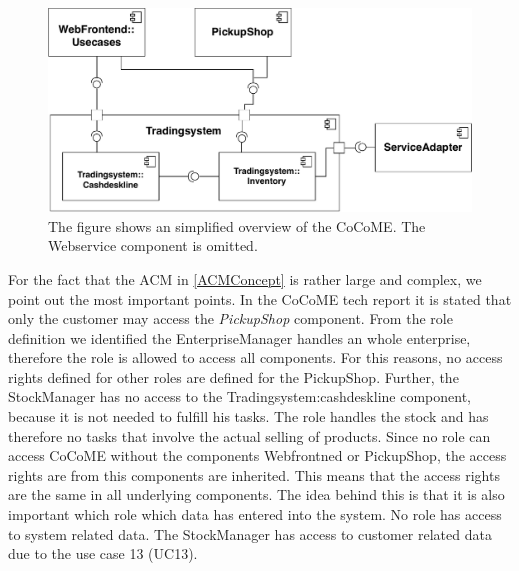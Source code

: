 \begin{figure}
\includegraphics[scale=.8]{logos/Overview_CoCoME.pdf}
\caption{The figure shows an simplified overview of the CoCoME. The Webservice component is omitted.}
\label{CoCoME_simplified}
\end{figure}
For the fact that the ACM in \autoref{ACMConcept} is rather large and complex, we point out the most important points. In the CoCoME tech report it is stated that only the customer may access the \textit{PickupShop}  component. From the role definition we identified the EnterpriseManager handles an whole enterprise, therefore the role is allowed to access all components. For this reasons, no access rights defined for other roles are defined for the PickupShop. Further, the StockManager has no access to the Tradingsystem:cashdeskline component, because it is not needed to fulfill his tasks. The role handles the stock and has therefore no tasks that involve the actual selling of products. Since no role can access CoCoME without the components Webfrontned or PickupShop, the access rights are from this components are inherited. This means that the access rights are the same in all underlying components. The idea behind this is that it is also important which role which data has entered into the system. No role has access to system related data. The StockManager has access to customer related data due to the use case 13 (UC13). 

